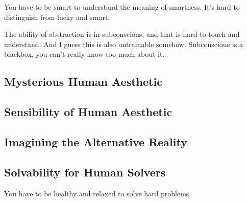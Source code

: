 You have to be smart to understand the meaning of smartness. It's hard to distinguish from lucky and smart.

The ability of abstraction is in subconscious, and that is hard to touch and understand. And I guess this is also untrainable somehow. Subconscious is a blackbox, you can't really know too much about it.

\subsection{Mysterious Human Aesthetic}
\subsection{Sensibility of Human Aesthetic}
\subsection{Imagining the Alternative Reality}
\subsection{Solvability for Human Solvers}

You have to be healthy and relaxed to solve hard problems.
